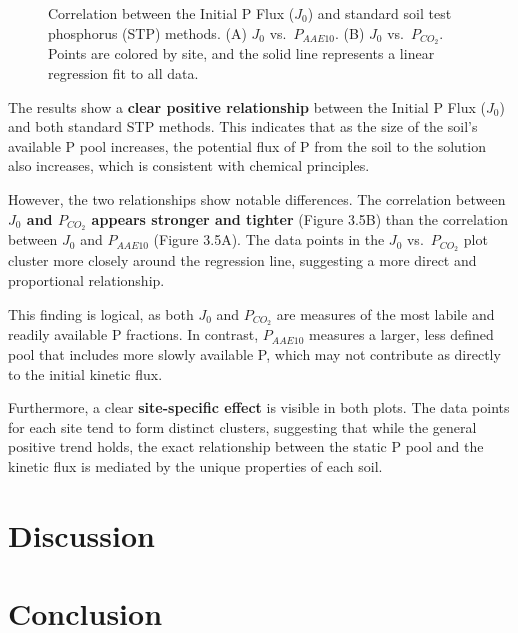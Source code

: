 \documentclass[
  a4paper,
]{article}
\begin{document}
\begin{figure}
\begin{minipage}{0.50\linewidth}
{}


\end{minipage}%

\caption{\label{fig-j0-vs-stp}Correlation between the Initial P Flux
(\(J_0\)) and standard soil test phosphorus (STP) methods. (A) \(J_0\)
vs.~\(P_{AAE10}\). (B) \(J_0\) vs.~\(P_{CO_2}\). Points are colored by
site, and the solid line represents a linear regression fit to all
data.}

\end{figure}%

The results show a \textbf{clear positive relationship} between the
Initial P Flux (\(J_0\)) and both standard STP methods. This indicates
that as the size of the soil's available P pool increases, the potential
flux of P from the soil to the solution also increases, which is
consistent with chemical principles.

However, the two relationships show notable differences. The correlation
between \textbf{\(J_0\) and \(P_{CO_2}\) appears stronger and tighter}
(Figure 3.5B) than the correlation between \(J_0\) and \(P_{AAE10}\)
(Figure 3.5A). The data points in the \(J_0\) vs.~\(P_{CO_2}\) plot
cluster more closely around the regression line, suggesting a more
direct and proportional relationship.

This finding is logical, as both \(J_0\) and \(P_{CO_2}\) are measures
of the most labile and readily available P fractions. In contrast,
\(P_{AAE10}\) measures a larger, less defined pool that includes more
slowly available P, which may not contribute as directly to the initial
kinetic flux.

Furthermore, a clear \textbf{site-specific effect} is visible in both
plots. The data points for each site tend to form distinct clusters,
suggesting that while the general positive trend holds, the exact
relationship between the static P pool and the kinetic flux is mediated
by the unique properties of each soil.

\section{Discussion}\label{discussion}

\section{Conclusion}\label{conclusion}
\end{document}
